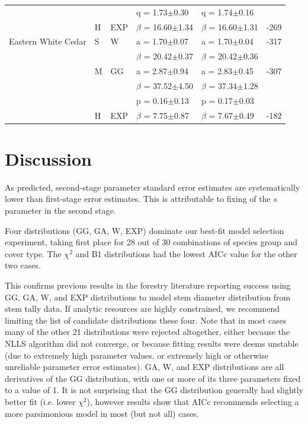 \documentclass{article}
\begin{document}
\begin{table}
{\begin{tabular}{lllllr}
 &  &  & q = 1.73$\pm$0.30 & q = 1.74$\pm$0.16 &  \\
 & H & EXP & $\beta$ = 16.60$\pm$1.34 & $\beta$ = 16.60$\pm$1.31 & -269 \\
Eastern White Cedar & S & W & a = 1.70$\pm$0.07 & a = 1.70$\pm$0.04 & -317 \\
 &  &  & $\beta$ = 20.42$\pm$0.37 & $\beta$ = 20.42$\pm$0.36 &  \\
 & M & GG & a = 2.87$\pm$0.94 & a = 2.83$\pm$0.45 & -307 \\
 &  &  & $\beta$ = 37.52$\pm$4.50 & $\beta$ = 37.34$\pm$1.28 &  \\
 &  &  & p = 0.16$\pm$0.13 & p = 0.17$\pm$0.03 &  \\
 & H & EXP & $\beta$ = 7.75$\pm$0.87 & $\beta$ = 7.67$\pm$0.49 & -182 \\
\bottomrule
\end{tabular}
}%
\end{table}

\section{Discussion}
\label{sec:discussion}

As predicted, second-stage parameter standard error estimates are systematically lower than first-stage error estimates.
This is attributable to fixing of the $s$ parameter in the second stage. 

Four distributions (GG, GA, W, EXP) dominate our best-fit model selection experiment, taking first place for 28 out of 30 combinations of species group and cover type. 
The $\chi^2$ and B1 distributions had the lowest AICc value for the other two cases.

This confirms previous results in the forestry literature reporting success using GG, GA, W, and EXP distributions to model stem diameter distribution from stem tally data.
If analytic resources are highly constrained, we recommend limiting the list of candidate distributions these four.
Note that in most cases many of the other 21 distributions were rejected altogether, either because the NLLS algorithm did not converge, or because fitting results were deems unstable (due to extremely high parameter values, or extremely high or otherwise unreliable parameter error estimates).
GA, W, and EXP distributions are all derivatives of the GG distribution, with one or more of its three parameters fixed to a value of 1. 
It is not surprising that the GG distribution generally had slightly better fit (i.e. lower $\chi^2$), however results show that AICc recommends selecting a more parsimonious model in most (but not all) cases.
\end{document}
